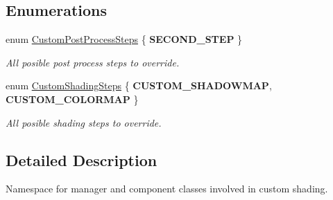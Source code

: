\subsection*{Enumerations}
\begin{DoxyCompactItemize}
\item 
\mbox{\label{namespace_geometry_engine_1_1_custom_shading_a09e44ca81de5fe08c6d50271d680c4b1}} 
enum \mbox{\hyperlink{namespace_geometry_engine_1_1_custom_shading_a09e44ca81de5fe08c6d50271d680c4b1}{Custom\+Post\+Process\+Steps}} \{ {\bfseries S\+E\+C\+O\+N\+D\+\_\+\+S\+T\+EP}
 \}
\begin{DoxyCompactList}\small\item\em All posible post process steps to override. \end{DoxyCompactList}\item 
\mbox{\label{namespace_geometry_engine_1_1_custom_shading_a2dc236a5b567da5099069ce2b2be5609}} 
enum \mbox{\hyperlink{namespace_geometry_engine_1_1_custom_shading_a2dc236a5b567da5099069ce2b2be5609}{Custom\+Shading\+Steps}} \{ {\bfseries C\+U\+S\+T\+O\+M\+\_\+\+S\+H\+A\+D\+O\+W\+M\+AP}, 
{\bfseries C\+U\+S\+T\+O\+M\+\_\+\+C\+O\+L\+O\+R\+M\+AP}
 \}
\begin{DoxyCompactList}\small\item\em All posible shading steps to override. \end{DoxyCompactList}\end{DoxyCompactItemize}


\subsection{Detailed Description}
Namespace for manager and component classes involved in custom shading. 